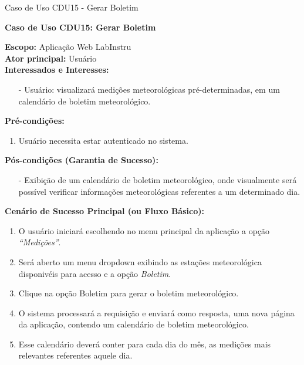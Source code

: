 \begin{quadro}[H]
	\centering
	\caption{Caso de Uso CDU15 - Gerar Boletim}

	\begin{framed}

		\textbf{Caso de Uso CDU15: Gerar Boletim}\\

		\begin{flushleft}

		\textbf{Escopo:} Aplicação Web LabInstru\\

		\textbf{Ator principal:} Usuário\\

		\textbf{Interessados e Interesses:}
		\begin{itemize}
			\item[-] Usuário: visualizará medições meteorológicas pré-determinadas, em um calendário de boletim meteorológico.
		\end{itemize}

		\textbf{Pré-condições:}\\
			 \begin{enumerate}
			 	\item{Usuário necessita estar autenticado no sistema.}
			 \end{enumerate}

		\textbf{Pós-condições (Garantia de Sucesso):}
		\begin{itemize}
			\item[-] Exibição de um calendário de boletim meteorológico, onde visualmente será possível verificar informações meteorológicas referentes a um determinado dia.
			\end{itemize}

		\textbf{Cenário de Sucesso Principal (ou Fluxo Básico):}
			\begin{enumerate}
				\item{O usuário iniciará escolhendo no menu principal da aplicação a opção \textit{``Medições''}.}
				\item{Será aberto um menu dropdown exibindo as estações meteorológica disponivéis para acesso e a opção \textit{Boletim}.}
				\item{Clique na opção Boletim para gerar o boletim meteorológico.}
				\item{O sistema processará a requisição e enviará como resposta, uma nova página da aplicação, contendo um calendário de boletim meteorológico.}
				\item{Esse calendário deverá conter para cada dia do mês, as medições mais relevantes referentes aquele dia.}
			 \end{enumerate}


\end{flushleft}
\end{framed}
\end{quadro}
